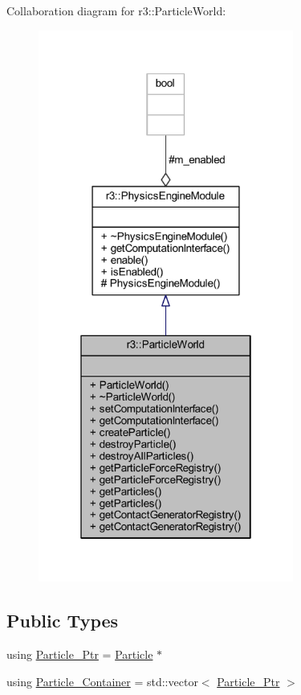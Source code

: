 Collaboration diagram for r3\+:\+:Particle\+World\+:\nopagebreak
\begin{figure}[H]
\begin{center}
\leavevmode
\includegraphics[width=238pt]{classr3_1_1_particle_world__coll__graph}
\end{center}
\end{figure}
\subsection*{Public Types}
\begin{DoxyCompactItemize}
\item 
using \mbox{\hyperlink{classr3_1_1_particle_world_a12b4624a202a6b22629a3328f083ac81}{Particle\+\_\+\+Ptr}} = \mbox{\hyperlink{classr3_1_1_particle}{Particle}} $\ast$
\item 
using \mbox{\hyperlink{classr3_1_1_particle_world_aa354f6786c0837674fe8286f00465631}{Particle\+\_\+\+Container}} = std\+::vector$<$ \mbox{\hyperlink{classr3_1_1_particle_world_a12b4624a202a6b22629a3328f083ac81}{Particle\+\_\+\+Ptr}} $>$
\end{DoxyCompactItemize}
